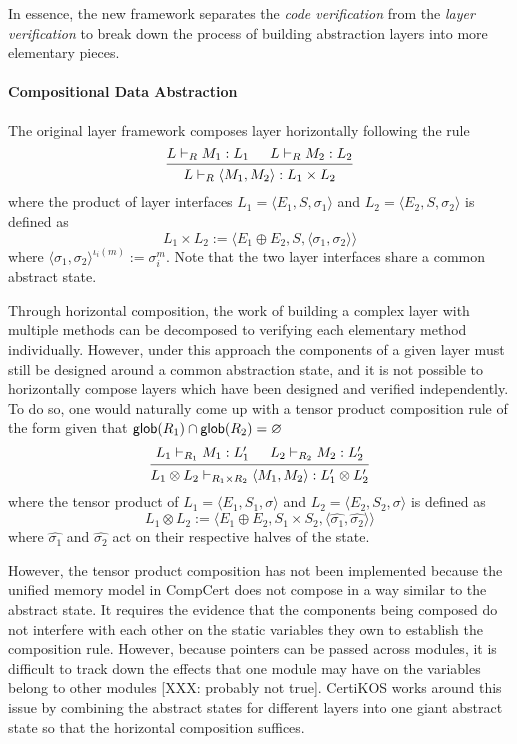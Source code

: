 \documentclass[sigplan,10pt,authordraft]{acmart}
\begin{document}
In essence, the new framework separates the \emph{code verification}
from the \emph{layer verification}
to break down the process of building abstraction layers
into more elementary pieces.

\paragraph{Compositional Data Abstraction}
The original layer framework composes layer horizontally
following the rule
\[
  \begin{prooftree}
    \hypo{L \vdash_R M_1 : L_1}
    \hypo{L \vdash_R M_2 : L_2}
    \infer2{L \vdash_R \langle M_1, M_2 \rangle : L_1 \times L_2}
  \end{prooftree}
\]
where the product of layer interfaces $L_1 = \langle E_1, S, \sigma_1 \rangle$
and $L_2 = \langle E_2, S, \sigma_2 \rangle$
is defined as
\[
  L_1 \times L_2 := \langle E_1 \oplus E_2, S, \langle \sigma_1, \sigma_2 \rangle \rangle
\]
where $\langle \sigma_1, \sigma_2 \rangle^{\iota_i(m)} := \sigma_i^m$.
Note that the two layer interfaces share
a common abstract state.

Through horizontal composition,
the work of building
a complex layer with multiple methods
can be decomposed to verifying
each elementary method individually.
However, under this approach
the components of a given layer
must still be designed around a common abstraction state,
and it is not possible to horizontally compose layers
which have been designed and verified independently.
To do so, one would naturally come up with
a tensor product composition rule of the form
given that $ \mathsf{glob} (R_1) \cap  \mathsf{glob} (R_2) = \varnothing$
\[
  \begin{prooftree}
    \hypo{L_1 \vdash_{R_1} M_1 : L_1'}
    \hypo{L_2 \vdash_{R_2} M_2 : L_2'}
    \infer2{L_1 \otimes L_2 \vdash_{R_1\times R_2} \langle M_1, M_2 \rangle : L_1' \otimes L_2'}
  \end{prooftree}
\]
where the tensor product of $L_1 = \langle E_1, S_1, \sigma \rangle$
and $L_2 = \langle E_2, S_2, \sigma \rangle$
is defined as
\[
  L_1 \otimes L_2 := \langle E_1 \oplus E_2, S_1 \times S_2,
  \langle \hat{\sigma_1}, \hat{\sigma_2} \rangle \rangle
\]
where $\hat{\sigma_1}$ and $\hat{\sigma_2}$
act on their respective halves of the state.

However, the tensor product composition has not been implemented
because the unified memory model in CompCert
does not compose in a way similar to the abstract state.
It requires the evidence that 
the components being composed do not interfere
with each other
on the static variables they own
to establish the composition rule.
However, because pointers can be passed across modules, 
it is difficult to track down 
the effects that one module may have
on the variables belong to other modules
[XXX: probably not true].
CertiKOS works around this issue by combining
the abstract states for different layers
into one giant abstract state
so that the horizontal composition suffices.
\end{document}
